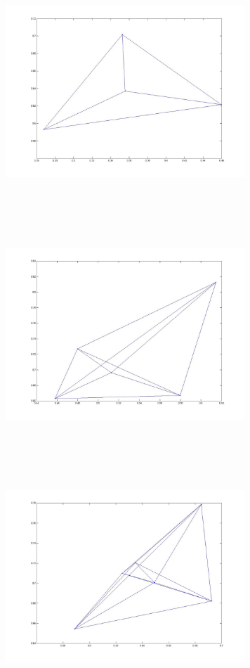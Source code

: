 \includegraphics[width=9.0cm,height=9.0cm]{images/GraphTheory/Clique_4_Members.jpg}
\includegraphics[width=9.0cm,height=9.0cm]{images/GraphTheory/Clique_5_Members.jpg}
\includegraphics[width=9.0cm,height=9.0cm]{images/GraphTheory/Clique_6_Members.jpg}
